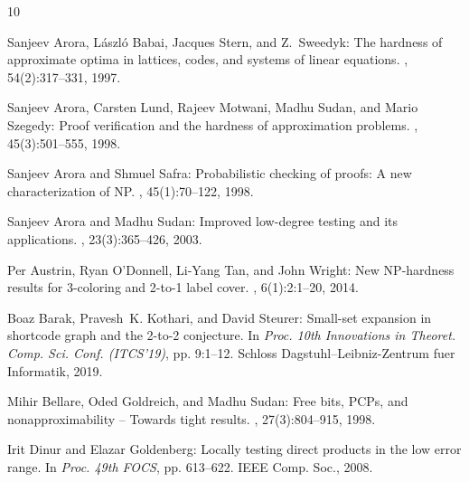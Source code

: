\documentclass[11pt]{article}
\numberwithin{equation}{section}
\theoremstyle{definition}
\theoremstyle{plain}
\begin{document}
\tocrefpdfbookmark
\begin{thebibliography}{10}

{\sc Sanjeev Arora, L{\'{a}}szl{\'{o}} Babai, Jacques Stern, and Z.~Sweedyk}:
  The hardness of approximate optima in lattices, codes, and systems of linear
  equations.
, 54(2):317--331, 1997.

{\sc Sanjeev Arora, Carsten Lund, Rajeev Motwani, Madhu Sudan, and Mario
  Szegedy}: Proof verification and the hardness of approximation problems.
, 45(3):501--555, 1998.
\newblock [\epfmtdoi{10.1145/278298.278306}]

{\sc Sanjeev Arora and Shmuel Safra}: Probabilistic checking of proofs: {A} new
  characterization of {NP}.
, 45(1):70--122, 1998.
\newblock [\epfmtdoi{10.1145/273865.273901}]

{\sc Sanjeev Arora and Madhu Sudan}: Improved low-degree testing and its
  applications.
, 23(3):365--426, 2003.
\newblock [\epfmtdoi{10.1007/s00493-003-0025-0}]

{\sc Per Austrin, Ryan O'Donnell, Li{-}Yang Tan, and John Wright}: New
  {NP}-hardness results for 3-coloring and 2-to-1 label cover.
, 6(1):2:1--20, 2014.
\newblock [\epfmtdoi{10.1145/2537800}]

{\sc Boaz Barak, Pravesh~K. Kothari, and David Steurer}: Small-set expansion in
  shortcode graph and the 2-to-2 conjecture.
\newblock In {\em Proc. 10th Innovations in Theoret. Comp. Sci. Conf.
  (ITCS'19)}, pp. 9:1--12. Schloss Dagstuhl--Leibniz-Zentrum fuer Informatik,
  2019.

{\sc Mihir Bellare, Oded Goldreich, and Madhu Sudan}: Free bits, {PCP}s, and
  nonapproximability -- {T}owards tight results.
, 27(3):804--915, 1998.
\newblock [\epfmtdoi{10.1137/S0097539796302531}]

{\sc Irit Dinur and Elazar Goldenberg}: Locally testing direct products in the
  low error range.
\newblock In {\em Proc. 49th FOCS}, pp. 613--622. IEEE Comp. Soc., 2008.


\end{thebibliography}
\end{document}
